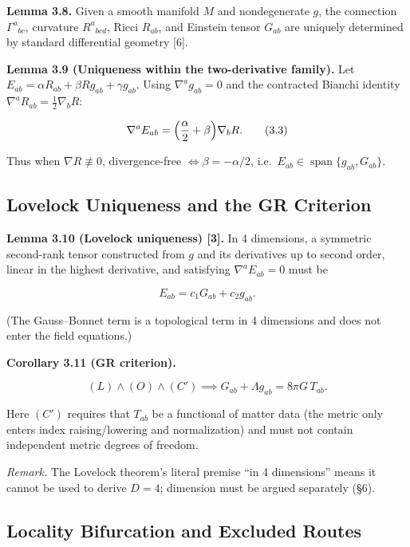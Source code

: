\documentclass[
  11pt,
]{article}
\begin{document}
\textbf{Lemma 3.8.} Given a smooth manifold \(M\) and nondegenerate
\(g\), the connection \(\Gamma^a{}_{bc}\), curvature \(R^a{}_{bcd}\),
Ricci \(R_{ab}\), and Einstein tensor \(G_{ab}\) are uniquely determined
by standard differential geometry {[}6{]}.

\textbf{Lemma 3.9 (Uniqueness within the two-derivative family).} Let
\(E_{ab}=\alpha R_{ab}+\beta Rg_{ab}+\gamma g_{ab}\). Using
\(\nabla^ag_{ab}=0\) and the contracted Bianchi identity
\(\nabla^aR_{ab}=\tfrac12\nabla_bR\):

\[
\nabla^aE_{ab}=\Bigl(\frac{\alpha}{2}+\beta\Bigr)\nabla_bR.
\tag{3.3}
\]

Thus when \(\nabla R\not\equiv0\), divergence-free
\(\iff\beta=-\alpha/2\),
i.e.~\(E_{ab}\in\operatorname{span}\{g_{ab},G_{ab}\}\).

\subsection{Lovelock Uniqueness and the GR
Criterion}\label{lovelock-uniqueness-and-the-gr-criterion}

\textbf{Lemma 3.10 (Lovelock uniqueness) {[}3{]}.} In 4 dimensions, a
symmetric second-rank tensor constructed from \(g\) and its derivatives
up to second order, linear in the highest derivative, and satisfying
\(\nabla^aE_{ab}=0\) must be

\[
E_{ab}=c_1G_{ab}+c_2g_{ab}.
\]

(The Gauss--Bonnet term is a topological term in 4 dimensions and does
not enter the field equations.)

\textbf{Corollary 3.11 (GR criterion).}

\[
(L)\wedge(O)\wedge(C') \implies G_{ab}+\Lambda g_{ab}=8\pi G\,T_{ab}.
\tag{3.4}
\]

Here \((C')\) requires that \(T_{ab}\) be a functional of matter data
(the metric only enters index raising/lowering and normalization) and
must not contain independent metric degrees of freedom.

\emph{Remark.} The Lovelock theorem's literal premise ``in 4
dimensions'' means it cannot be used to derive \(D=4\); dimension must
be argued separately (§6).

\subsection{Locality Bifurcation and Excluded
Routes}\label{locality-bifurcation-and-excluded-routes}
\end{document}
